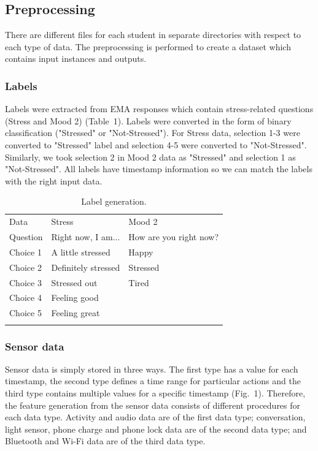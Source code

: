 \documentclass[3p,times,procedia]{elsarticle}
\begin{document}
\subsection{Preprocessing}
There are different files for each student in separate directories with respect to each type of data. The preprocessing is performed to create a dataset which contains input instances and outputs.

\subsubsection{Labels}
Labels were extracted from EMA responses which contain stress-related questions (Stress and Mood 2) (Table~1). Labels were converted in the form of binary classification ("Stressed" or "Not-Stressed"). For Stress data, selection 1-3 were converted to "Stressed" label and selection 4-5 were converted to "Not-Stressed". Similarly, we took selection 2 in Mood 2 data as "Stressed" and selection 1 as "Not-Stressed". All labels have timestamp information so we can match the labels with the right input data.

\begin{table}[h]
\caption{Label generation.}
\begin{tabular*}{\hsize}{@{\extracolsep{\fill}}lll@{}}
\toprule
Data & Stress & Mood 2\\
\colrule
Question & Right now, I am... & How are you right now?\\
Choice 1 & A little stressed & Happy\\
Choice 2 & Definitely stressed & Stressed\\
Choice 3 & Stressed out & Tired\\
Choice 4 & Feeling good\\
Choice 5 & Feeling great\\
\botrule
\end{tabular*}
\end{table}

\subsubsection{Sensor data}
Sensor data is simply stored in three ways. The first type has a value for each timestamp, the second type defines a time range for particular actions and the third type contains multiple values for a specific timestamp (Fig.~1). Therefore, the feature generation from the sensor data consists of different procedures for each data type. Activity and audio data are of the first data type; conversation, light sensor, phone charge and phone lock data are of the second data type; and Bluetooth and Wi-Fi data are of the third data type. 
\end{document}
